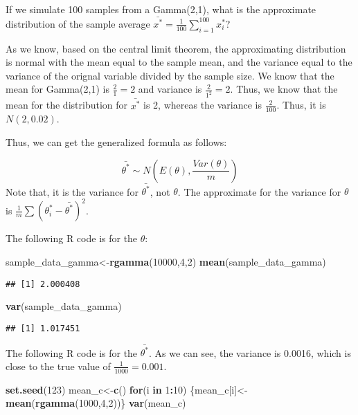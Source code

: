 \documentclass[]{book}
\newenvironment{Shaded}{\begin{snugshade}}{\end{snugshade}}
\newcommand{\KeywordTok}[1]{\textcolor[rgb]{0.13,0.29,0.53}{\textbf{#1}}}
\newcommand{\DecValTok}[1]{\textcolor[rgb]{0.00,0.00,0.81}{#1}}
\newcommand{\ControlFlowTok}[1]{\textcolor[rgb]{0.13,0.29,0.53}{\textbf{#1}}}
\newcommand{\OperatorTok}[1]{\textcolor[rgb]{0.81,0.36,0.00}{\textbf{#1}}}
\newcommand{\NormalTok}[1]{#1}
\begin{document}
If we simulate 100 samples from a Gamma(2,1), what is the approximate
distribution of the sample average
\(\bar{x^*}=\frac{1}{100} \sum_{i=1}^{100} x_i^*\)?

As we know, based on the central limit theorem, the approximating
distribution is normal with the mean equal to the sample mean, and the
variance equal to the variance of the orignal variable divided by the
sample size. We know that the mean for Gamma(2,1) is \(\frac{2}{1}=2\)
and variance is \(\frac{2}{1^2}=2\). Thus, we know that the mean for the
distribution for \(\bar{x^*}\) is 2, whereas the variance is
\(\frac{2}{100}\). Thus, it is \(N(2,0.02)\).

Thus, we can get the generalized formula as follows:

\[\bar{\theta^*} \sim N(E(\theta), \frac{Var(\theta)}{m})\] Note that,
it is the variance for \(\bar{\theta^*}\), not \(\theta\). The
approximate for the variance for \(\theta\) is
\(\frac{1}{m}\sum(\theta_i^*-\bar{\theta^*})^2\).

The following R code is for the \(\theta\):

\begin{Shaded}
\begin{Highlighting}[]
\NormalTok{sample_data_gamma<-}\KeywordTok{rgamma}\NormalTok{(}\DecValTok{10000}\NormalTok{,}\DecValTok{4}\NormalTok{,}\DecValTok{2}\NormalTok{)}
\KeywordTok{mean}\NormalTok{(sample_data_gamma)}
\end{Highlighting}
\end{Shaded}

\begin{verbatim}
## [1] 2.000408
\end{verbatim}

\begin{Shaded}
\begin{Highlighting}[]
\KeywordTok{var}\NormalTok{(sample_data_gamma)}
\end{Highlighting}
\end{Shaded}

\begin{verbatim}
## [1] 1.017451
\end{verbatim}

The following R code is for the \(\bar{\theta^*}\). As we can see, the
variance is 0.0016, which is close to the true value of
\(\frac{1}{1000}=0.001\).

\begin{Shaded}
\begin{Highlighting}[]
\KeywordTok{set.seed}\NormalTok{(}\DecValTok{123}\NormalTok{)}
\NormalTok{mean_c<-}\KeywordTok{c}\NormalTok{()}
\ControlFlowTok{for}\NormalTok{(i }\ControlFlowTok{in} \DecValTok{1}\OperatorTok{:}\DecValTok{10}\NormalTok{)}
\NormalTok{\{mean_c[i]<-}\KeywordTok{mean}\NormalTok{(}\KeywordTok{rgamma}\NormalTok{(}\DecValTok{1000}\NormalTok{,}\DecValTok{4}\NormalTok{,}\DecValTok{2}\NormalTok{))\}}
\KeywordTok{var}\NormalTok{(mean_c)}
\end{Highlighting}
\end{Shaded}
\end{document}
